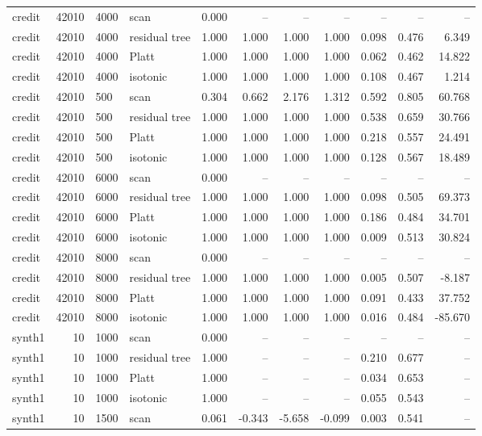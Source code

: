 \begin{tabular}{lrllrrrrrrr}
credit & 42010 & 4000 & scan & 0.000 & -- & -- & -- & -- & -- & -- \\
credit & 42010 & 4000 & residual tree & 1.000 & 1.000 & 1.000 & 1.000 & 0.098 & 0.476 & 6.349 \\
credit & 42010 & 4000 & Platt & 1.000 & 1.000 & 1.000 & 1.000 & 0.062 & 0.462 & 14.822 \\
credit & 42010 & 4000 & isotonic & 1.000 & 1.000 & 1.000 & 1.000 & 0.108 & 0.467 & 1.214 \\
credit & 42010 & 500 & scan & 0.304 & 0.662 & 2.176 & 1.312 & 0.592 & 0.805 & 60.768 \\
credit & 42010 & 500 & residual tree & 1.000 & 1.000 & 1.000 & 1.000 & 0.538 & 0.659 & 30.766 \\
credit & 42010 & 500 & Platt & 1.000 & 1.000 & 1.000 & 1.000 & 0.218 & 0.557 & 24.491 \\
credit & 42010 & 500 & isotonic & 1.000 & 1.000 & 1.000 & 1.000 & 0.128 & 0.567 & 18.489 \\
credit & 42010 & 6000 & scan & 0.000 & -- & -- & -- & -- & -- & -- \\
credit & 42010 & 6000 & residual tree & 1.000 & 1.000 & 1.000 & 1.000 & 0.098 & 0.505 & 69.373 \\
credit & 42010 & 6000 & Platt & 1.000 & 1.000 & 1.000 & 1.000 & 0.186 & 0.484 & 34.701 \\
credit & 42010 & 6000 & isotonic & 1.000 & 1.000 & 1.000 & 1.000 & 0.009 & 0.513 & 30.824 \\
credit & 42010 & 8000 & scan & 0.000 & -- & -- & -- & -- & -- & -- \\
credit & 42010 & 8000 & residual tree & 1.000 & 1.000 & 1.000 & 1.000 & 0.005 & 0.507 & -8.187 \\
credit & 42010 & 8000 & Platt & 1.000 & 1.000 & 1.000 & 1.000 & 0.091 & 0.433 & 37.752 \\
credit & 42010 & 8000 & isotonic & 1.000 & 1.000 & 1.000 & 1.000 & 0.016 & 0.484 & -85.670 \\
synth1 & 10 & 1000 & scan & 0.000 & -- & -- & -- & -- & -- & -- \\
synth1 & 10 & 1000 & residual tree & 1.000 & -- & -- & -- & 0.210 & 0.677 & -- \\
synth1 & 10 & 1000 & Platt & 1.000 & -- & -- & -- & 0.034 & 0.653 & -- \\
synth1 & 10 & 1000 & isotonic & 1.000 & -- & -- & -- & 0.055 & 0.543 & -- \\
synth1 & 10 & 1500 & scan & 0.061 & -0.343 & -5.658 & -0.099 & 0.003 & 0.541 & -- \\

\end{tabular}
